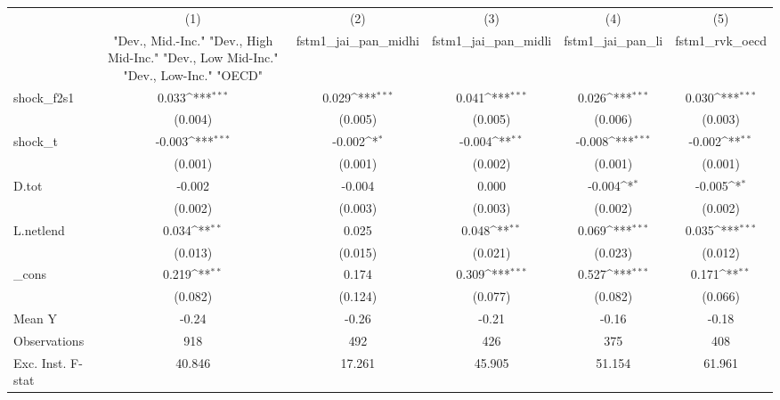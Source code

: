 {
\def\sym#1{\ifmmode^{#1}\else\(^{#1}\)\fi}
\begin{tabular}{l*{5}{c}}
\toprule
            &\multicolumn{1}{c}{(1)}&\multicolumn{1}{c}{(2)}&\multicolumn{1}{c}{(3)}&\multicolumn{1}{c}{(4)}&\multicolumn{1}{c}{(5)}\\
            &\multicolumn{1}{c}{ "Dev., Mid.-Inc." "Dev., High Mid-Inc." "Dev., Low Mid-Inc." "Dev., Low-Inc." "OECD" }&\multicolumn{1}{c}{fstm1\_jai\_pan\_midhi}&\multicolumn{1}{c}{fstm1\_jai\_pan\_midli}&\multicolumn{1}{c}{fstm1\_jai\_pan\_li}&\multicolumn{1}{c}{fstm1\_rvk\_oecd}\\
\midrule
shock\_f2s1  &       0.033\sym{***}&       0.029\sym{***}&       0.041\sym{***}&       0.026\sym{***}&       0.030\sym{***}\\
            &     (0.004)         &     (0.005)         &     (0.005)         &     (0.006)         &     (0.003)         \\
\addlinespace
shock\_t     &      -0.003\sym{***}&      -0.002\sym{*}  &      -0.004\sym{**} &      -0.008\sym{***}&      -0.002\sym{**} \\
            &     (0.001)         &     (0.001)         &     (0.002)         &     (0.001)         &     (0.001)         \\
\addlinespace
D.tot       &      -0.002         &      -0.004         &       0.000         &      -0.004\sym{*}  &      -0.005\sym{*}  \\
            &     (0.002)         &     (0.003)         &     (0.003)         &     (0.002)         &     (0.002)         \\
\addlinespace
L.netlend   &       0.034\sym{**} &       0.025         &       0.048\sym{**} &       0.069\sym{***}&       0.035\sym{***}\\
            &     (0.013)         &     (0.015)         &     (0.021)         &     (0.023)         &     (0.012)         \\
\addlinespace
\_cons      &       0.219\sym{**} &       0.174         &       0.309\sym{***}&       0.527\sym{***}&       0.171\sym{**} \\
            &     (0.082)         &     (0.124)         &     (0.077)         &     (0.082)         &     (0.066)         \\
\midrule
Mean Y      &       -0.24         &       -0.26         &       -0.21         &       -0.16         &       -0.18         \\
Observations&         918         &         492         &         426         &         375         &         408         \\
Exc. Inst. F-stat&      40.846         &      17.261         &      45.905         &      51.154         &      61.961         \\
\bottomrule
\end{tabular}
}
